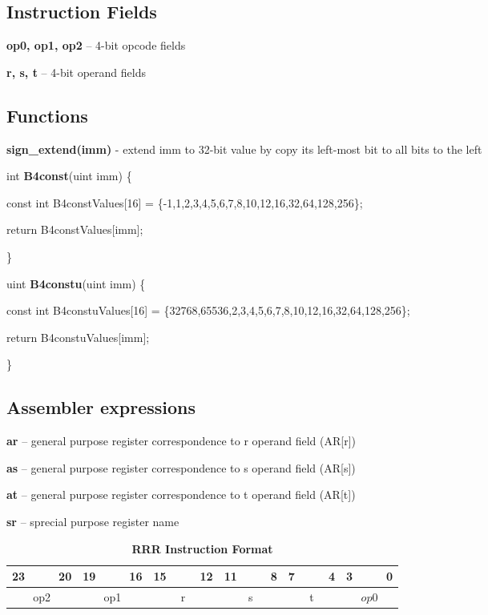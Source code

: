 
\subsection {Instruction Fields}

  \textbf{op0, op1, op2} – 4-bit opcode fields

  \textbf{r, s, t} – 4-bit operand fields

\subsection {Functions}


\textbf{sign\_extend(imm)} - extend imm to 32-bit value by copy its left-most bit to all bits to the left 

int \textbf{ B4const}(uint imm) \{
	
	const int B4constValues[16] = \{-1,1,2,3,4,5,6,7,8,10,12,16,32,64,128,256\};
	
	return  B4constValues[imm];
	
\}


uint \textbf{B4constu}(uint imm) \{
	
	const int B4constuValues[16] = \{32768,65536,2,3,4,5,6,7,8,10,12,16,32,64,128,256\};
	
	return  B4constuValues[imm];
	
\}


\subsection {Assembler expressions}

\textbf{ar} – general purpose register correspondence to r operand field (AR[r])

\textbf{as} – general purpose register correspondence to s operand field (AR[s])

\textbf{at} – general purpose register correspondence to t operand field (AR[t])

\textbf{sr} – sprecial purpose register name


\setlength{\tabcolsep}{8pt}

\begin{table}[H]
	\caption{\textbf{RRR Instruction Format}}
	\begin{tabular}{llllllllllllllllllllllll}
       23 & & & 20 & 19 & & & 16 & 15 & & & 12 & 11 & & & 8 & 7 & & & 4 & 3 & & & 0 \\
		\hline
		\multicolumn{4}{|c|}{op2} & \multicolumn{4}{c|}{op1} & \multicolumn{4}{c|}{r} & \multicolumn{4}{c|}{s} & \multicolumn{4}{c|}{t} & \multicolumn{4}{c|}{$op0$}\\
		\hline
	\end{tabular}
\end{table}

